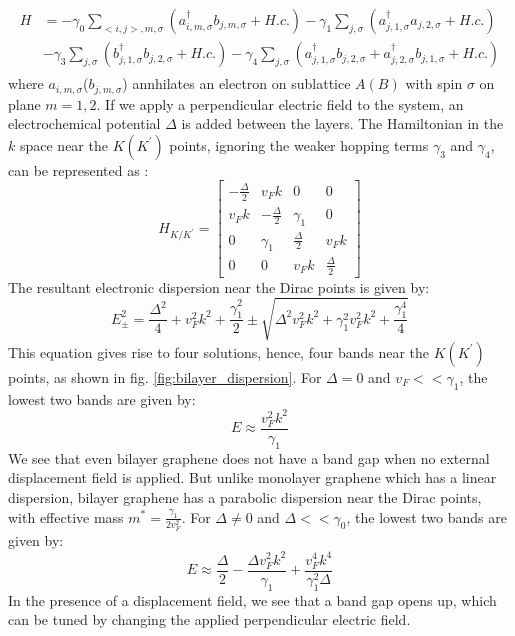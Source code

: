 \begin{align}
	\begin{split}
		H & = -\gamma_0\sum_{<i,j>,m,\sigma}(a_{i,m,\sigma}^\dagger b_{j,m,\sigma}+H.c.)-\gamma_1 \sum_{j,\sigma}(a_{j,1,\sigma}^\dagger a_{j,2,\sigma}+H.c.) \\
		& -\gamma_3 \sum_{j,\sigma}(b_{j,1,\sigma}^\dagger b_{j,2,\sigma}+H.c.)-\gamma_4 \sum_{j,\sigma}(a_{j,1,\sigma}^\dagger b_{j,2,\sigma}+a_{j,2,\sigma}^\dagger b_{j,1,\sigma}+H.c.)
	\end{split}
\end{align}
where $a_{i,m,\sigma}$($b_{j,m,\sigma}$) annhilates an electron on sublattice $A(B)$ with spin $\sigma$ on plane $m=1,2$. If we apply a perpendicular electric field to the system, an electrochemical potential $\Delta$ is added between the layers. The Hamiltonian in the $k$ space near the $K(K^\prime)$ points, ignoring the weaker hopping terms $\gamma_3$ and $\gamma_4$, can be represented as \cite{Geim}: 
\begin{equation}
	H_{K/K^\prime} = \begin{bmatrix}
		-\frac{\Delta}{2} & v_Fk & 0 & 0 \\
		v_Fk & -\frac{\Delta}{2} & \gamma_1 & 0 \\
		0 & \gamma_1 & \frac{\Delta}{2} & v_Fk \\
		0 & 0 & v_Fk & \frac{\Delta}{2}
	\end{bmatrix}
\end{equation}
The resultant electronic dispersion near the Dirac points is given by:
\begin{equation}
	E_\pm^2 = \frac{\Delta^2}{4}+v_F^2k^2+\frac{\gamma_1^2}{2}\pm\sqrt{\Delta^2v_F^2k^2+\gamma_1^2v_F^2k^2+\frac{\gamma_1^4}{4}}
\end{equation}
This equation gives rise to four solutions, hence, four bands near the $K(K^\prime)$ points, as shown in fig. \ref{fig:bilayer_dispersion}. For $\Delta=0$ and  $v_F<<\gamma_1$, the lowest two bands are given by:
\begin{equation}
	E\approx\frac{v_F^2k^2}{\gamma_1}
\end{equation}
We see that even bilayer graphene does not have a band gap when no external displacement field is applied. But unlike monolayer graphene which has a linear dispersion, bilayer graphene has a parabolic dispersion near the Dirac points, with effective mass $m^*=\frac{\gamma_1}{2v_F^2}$.
For $\Delta\neq 0$ and $\Delta<<\gamma_0$, the lowest two bands are given by:
\begin{equation}
	E \approx \frac{\Delta}{2}-\frac{ \Delta v^{2}_{F} k^{2}}{\gamma_1}+\frac{v^{4}_F k^{4}}{ \gamma_1^{2} \Delta}
\end{equation}
In the presence of a displacement field, we see that a band gap opens up, which can be tuned by changing the applied perpendicular electric field.

